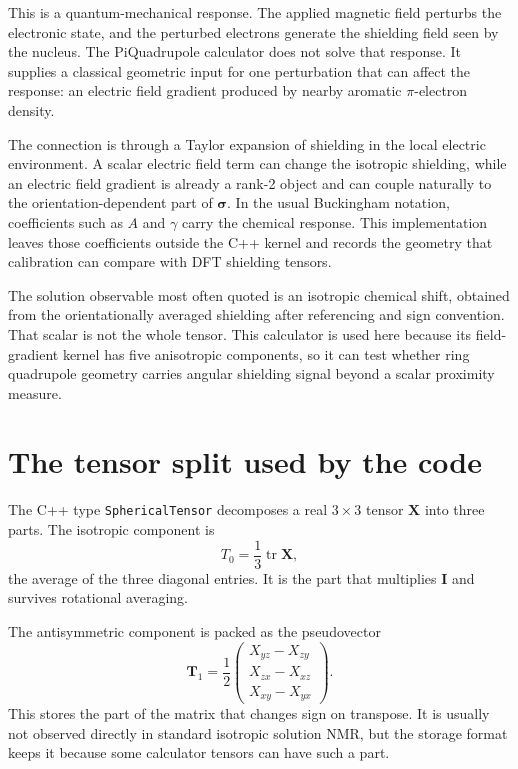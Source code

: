 \documentclass[11pt]{article}
\begin{document}
This is a quantum-mechanical response. The applied magnetic field perturbs the
electronic state, and the perturbed electrons generate the shielding field
seen by the nucleus. The PiQuadrupole calculator does not solve that response.
It supplies a classical geometric input for one perturbation that can affect
the response: an electric field gradient produced by nearby aromatic
\(\pi\)-electron density.

The connection is through a Taylor expansion of shielding in the local
electric environment. A scalar electric field term can change the isotropic
shielding, while an electric field gradient is already a rank-2 object and can
couple naturally to the orientation-dependent part of \(\bm\sigma\). In the
usual Buckingham notation, coefficients such as \(A\) and \(\gamma\) carry the
chemical response. This implementation leaves those coefficients outside the
C++ kernel and records the geometry that calibration can compare with DFT
shielding tensors.

The solution observable most often quoted is an isotropic chemical shift,
obtained from the orientationally averaged shielding after referencing and
sign convention. That scalar is not the whole tensor. This calculator is
used here because its field-gradient kernel has five anisotropic components,
so it can test whether ring quadrupole geometry carries angular shielding
signal beyond a scalar proximity measure.

\section{The tensor split used by the code}

The C++ type \texttt{SphericalTensor} decomposes a real \(3\times3\) tensor
\(\bm X\) into three parts. The isotropic component is
\begin{equation}
  T_0 = \frac{1}{3}\operatorname{tr}\bm X ,
  \label{eq:t0}
\end{equation}
the average of the three diagonal entries. It is the part that multiplies
\(\bm I\) and survives rotational averaging.

The antisymmetric component is packed as the pseudovector
\begin{equation}
  \bm T_1 =
  \frac{1}{2}
  \begin{pmatrix}
    X_{yz}-X_{zy}\\
    X_{zx}-X_{xz}\\
    X_{xy}-X_{yx}
  \end{pmatrix}.
  \label{eq:t1}
\end{equation}
This stores the part of the matrix that changes sign on transpose. It is
usually not observed directly in standard isotropic solution NMR, but the
storage format keeps it because some calculator tensors can have such a part.
\end{document}

